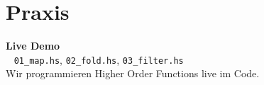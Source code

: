\documentclass[aspectratio=169,11pt]{beamer}
\begin{document}
\section{Praxis}

\begin{frame}[plain]
    \begin{center}
        \Huge \textbf{Live Demo} \\
        \vspace{0.5cm}
        \large \faLaptopCode~ \texttt{01\_map.hs}, \texttt{02\_fold.hs}, \texttt{03\_filter.hs} \\
        \vspace{0.3cm}
        \normalsize Wir programmieren Higher Order Functions live im Code.
    \end{center}
\end{frame}
\end{document}
